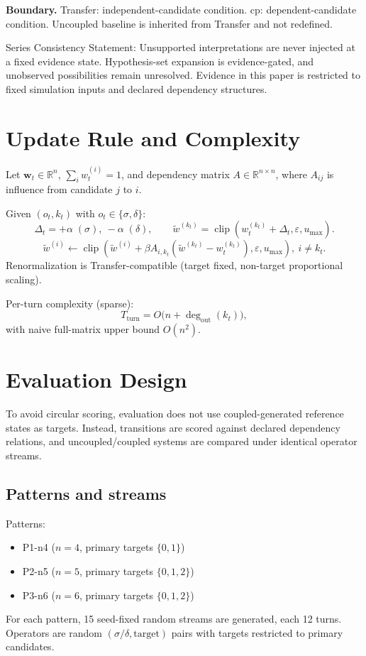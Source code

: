 \documentclass[11pt,a4paper]{article}
\begin{document}
\textbf{Boundary.}
Transfer: independent-candidate condition.
cp: dependent-candidate condition.
Uncoupled baseline is inherited from Transfer and not redefined.

Series Consistency Statement: Unsupported interpretations are never injected at a fixed evidence state. Hypothesis-set expansion is evidence-gated, and unobserved possibilities remain unresolved. Evidence in this paper is restricted to fixed simulation inputs and declared dependency structures.

\section{Update Rule and Complexity}
Let \(\mathbf{w}_t\in\mathbb{R}^n\), \(\sum_i w_t^{(i)}=1\), and dependency matrix \(A\in\mathbb{R}^{n\times n}\), where \(A_{ij}\) is influence from candidate \(j\) to \(i\).

Given \((o_t,k_t)\) with \(o_t\in\{\sigma,\delta\}\):
\[
\Delta_t = +\alpha\;(\sigma),\ -\alpha\;(\delta),\qquad
\tilde{w}^{(k_t)}=\operatorname{clip}(w_t^{(k_t)}+\Delta_t,\varepsilon,u_{\max}).
\]
\[
\tilde{w}^{(i)} \leftarrow \operatorname{clip}(\tilde{w}^{(i)}+\beta A_{i,k_t}(\tilde{w}^{(k_t)}-w_t^{(k_t)}),\varepsilon,u_{\max}),\ i\neq k_t.
\]
Renormalization is Transfer-compatible (target fixed, non-target proportional scaling).

Per-turn complexity (sparse):
\[
T_{\text{turn}}=O\big(n+\deg_{\text{out}}(k_t)\big),
\]
with naive full-matrix upper bound \(O(n^2)\).

\section{Evaluation Design}
To avoid circular scoring, evaluation does not use coupled-generated reference states as targets. Instead, transitions are scored against declared dependency relations, and uncoupled/coupled systems are compared under identical operator streams.

\subsection{Patterns and streams}
Patterns:
\begin{itemize}
  \item P1-n4 (\(n=4\), primary targets \(\{0,1\}\))
  \item P2-n5 (\(n=5\), primary targets \(\{0,1,2\}\))
  \item P3-n6 (\(n=6\), primary targets \(\{0,1,2\}\))
\end{itemize}
For each pattern, 15 seed-fixed random streams are generated, each 12 turns.
Operators are random \((\sigma/\delta,\text{target})\) pairs with targets restricted to primary candidates.
\end{document}

